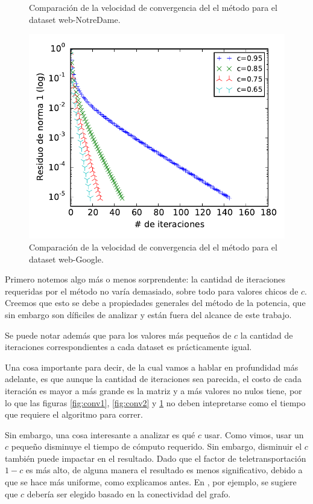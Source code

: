 \begin{figure}[H]
\begin{minipage}{0.48\textwidth}
  \caption{\footnotesize{Comparación de la velocidad de convergencia del el método para el dataset web-NotreDame.}}
  \label{fig:conv2}
\end{minipage}
\begin{minipage}{0.5\textwidth}
  \centering
    \includegraphics[width=1\textwidth]{imgs/convergencia-google.pdf}
  \caption{\footnotesize{Comparación de la velocidad de convergencia del el método para el dataset web-Google.}}
  \label{fig:conv3}
\end{minipage}
\end{figure}


Primero notemos algo más o menos sorprendente: la cantidad de iteraciones requeridas por el método no varía demasiado, sobre todo para valores chicos de $c$. Creemos que esto se debe a propiedades generales del método de la potencia, que sin embargo son díficiles de analizar y están fuera del alcance de este trabajo.

Se puede notar además que para los valores más pequeños de $c$ la cantidad de iteraciones correspondientes a cada dataset es prácticamente igual.

Una cosa importante para decir, de la cual vamos a hablar en profundidad más adelante, es que aunque la cantidad de iteraciones sea parecida, el costo de cada iteración es mayor a más grande es la matriz y a más valores no nulos tiene, por lo que las figuras \ref{fig:conv1}, \ref{fig:conv2} y \ref{fig:conv3} no deben intepretarse como el tiempo que requiere el algoritmo para correr.

Sin embargo, una cosa interesante a analizar es qué $c$ usar. Como vimos, usar un $c$ pequeño disminuye el tiempo de cómputo requerido. Sin embargo, disminuir el $c$ también puede impactar en el resultado. Dado que el factor de teletransportación $1-c$ es más alto, de alguna manera el resultado es menos significativo, debido a que se hace más uniforme, como explicamos antes. 
En \cite{Chakrabarti}, por ejemplo, se sugiere que $c$ debería ser elegido basado en la conectividad del grafo.


